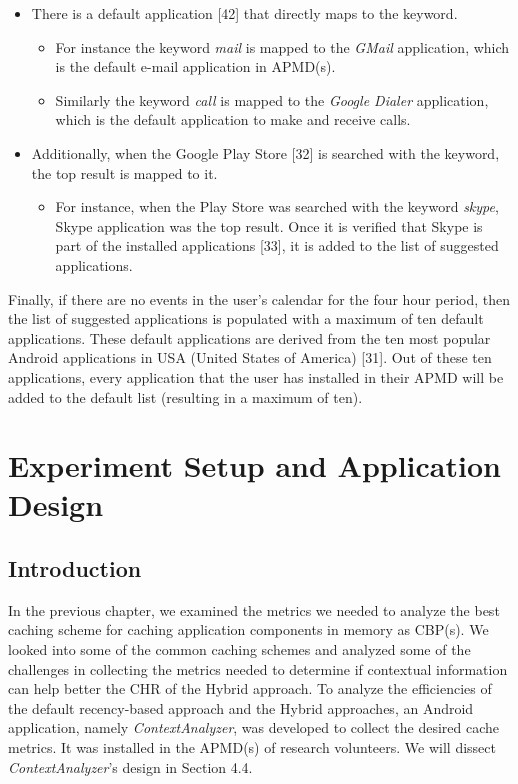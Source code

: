 \documentclass[12pt]{uthesis-v12}  %
\begin{document}
			\begin{itemize}
				
				\item There is a default application [42] that directly maps to the keyword.
					
					\begin{itemize}
						\item For instance the keyword {\em mail} is mapped to the {\em GMail} application, which is the default e-mail application in APMD(s).
						\item Similarly the keyword {\em call} is mapped to the {\em Google Dialer} application, which is the default application to make and receive calls.
					\end{itemize}
				
				\item Additionally, when the Google Play Store [32] is searched with the keyword, the top result is mapped to it.
					
					\begin{itemize}
						\item  For instance, when the Play Store was searched with the keyword {\em skype}, Skype application was the top result. Once it is verified that Skype is part of the installed applications [33], it is added to the list of suggested applications.
					\end{itemize}
					
			\end{itemize}

			Finally, if there are no events in the user's calendar for the four hour period, then the list of suggested applications is populated with a maximum of ten default applications. These default applications are derived from the ten most popular Android applications in USA (United States of America) [31]. Out of these ten applications, every application that the user has installed in their APMD will be added to the default list (resulting in a maximum of ten).

\chapter{Experiment Setup and Application Design}
	
	\section{Introduction}
		In the previous chapter, we examined the metrics we needed to analyze the best caching scheme for caching application components in memory as CBP(s). We looked into some of the common caching schemes and analyzed some of the challenges in collecting the metrics needed to determine if contextual information can help better the CHR of the Hybrid approach. To analyze the efficiencies of the default recency-based approach and the Hybrid approaches, an Android application, namely {\em ContextAnalyzer}, was developed to collect the desired cache metrics. It was installed in the APMD(s) of research volunteers. We will dissect {\em ContextAnalyzer}'s design in Section 4.4.  
		
\end{document}
